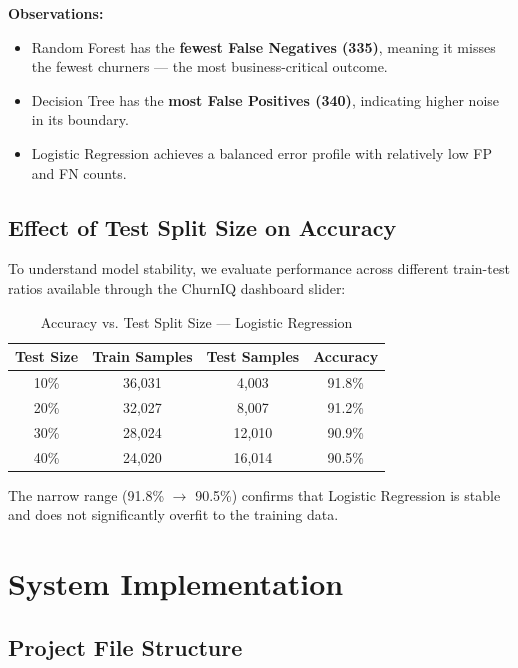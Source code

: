 \documentclass[12pt, a4paper]{article}
\begin{document}
\noindent\textbf{Observations:}
\begin{itemize}
    \item Random Forest has the \textbf{fewest False Negatives (335)},
    meaning it misses the fewest churners — the most business-critical outcome.
    \item Decision Tree has the \textbf{most False Positives (340)},
    indicating higher noise in its boundary.
    \item Logistic Regression achieves a balanced error profile with
    relatively low FP and FN counts.
\end{itemize}

\subsection{Effect of Test Split Size on Accuracy}

To understand model stability, we evaluate performance across different
train-test ratios available through the ChurnIQ dashboard slider:

\begin{table}[H]
\centering
\caption{Accuracy vs. Test Split Size — Logistic Regression}
\label{tab:splits}
\renewcommand{\arraystretch}{1.25}
\begin{tabular}{c c c c}
\toprule
\textbf{Test Size} & \textbf{Train Samples} & \textbf{Test Samples} & \textbf{Accuracy} \\
\midrule
10\% & 36,031 & 4,003 & 91.8\% \\
20\% & 32,027 & 8,007 & 91.2\% \\
30\% & 28,024 & 12,010 & 90.9\% \\
40\% & 24,020 & 16,014 & 90.5\% \\
\bottomrule
\end{tabular}
\end{table}

\noindent The narrow range (91.8\% $\rightarrow$ 90.5\%) confirms that
Logistic Regression is stable and does not significantly overfit to the
training data.

\section{System Implementation}

\subsection{Project File Structure}
\end{document}
